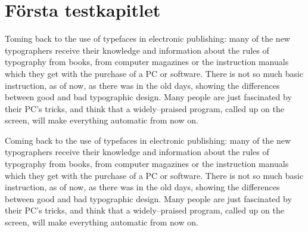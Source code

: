 \chapter{Första testkapitlet}
\placeinitial
Toming back to the use of typefaces in electronic publishing:
many of the new typographers receive their knowledge and
information about the rules of typography from books, from
computer magazines or the instruction manuals which they get with the
purchase of a PC or software. There is not so much basic instruction, as
of now, as there was in the old days, showing the differences between
good and bad typographic design. Many people are just fascinated by
their PC's tricks, and think that a widely--praised program, called up on
the screen, will make everything automatic from now on.

\placeinitial
Coming back to the use of typefaces in electronic publishing:
many of the new typographers receive their knowledge and
information about the rules of typography from books, from
computer magazines or the instruction manuals which they get with the
purchase of a PC or software. There is not so much basic instruction, as
of now, as there was in the old days, showing the differences between
good and bad typographic design. Many people are just fascinated by
their PC's tricks, and think that a widely--praised program, called up on
the screen, will make everything automatic from now on.
